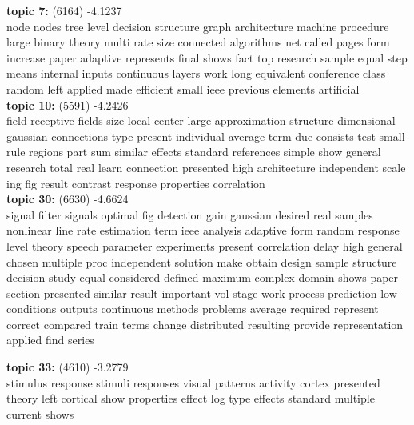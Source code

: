 \documentclass{article}
\begin{document}
\begin{spacing}{1.1}
\begin{table}[ht]
\begin{minipage}[b]{0.5\linewidth}
\begin{center}
{\bf topic 7:} (6164) -4.1237\\
node nodes tree level decision structure graph architecture machine procedure large binary theory multi rate size connected algorithms net called pages form increase paper adaptive represents final shows fact top research sample equal step means internal inputs continuous layers work long equivalent conference class random left applied made efficient small ieee previous elements artificial \\
{\bf topic 10:} (5591) -4.2426\\
field receptive fields size local center large approximation structure dimensional gaussian connections type present individual average term due consists test small rule regions part sum similar effects standard references simple show general research total real learn connection presented high architecture independent scale ing fig result contrast response properties correlation \\
{\bf topic 30:} (6630) -4.6624\\
signal filter signals optimal fig detection gain gaussian desired real samples nonlinear line rate estimation term ieee analysis adaptive form random response level theory speech parameter experiments present correlation delay high general chosen multiple proc independent solution make obtain design sample structure decision study equal considered defined maximum complex domain shows paper section presented similar result important vol stage work process prediction low conditions outputs continuous methods problems average required represent correct compared train terms change distributed resulting provide representation applied find series \\
\end{center}
\end{minipage}
\end{table}
\begin{table}[ht]
\begin{minipage}[b]{0.5\linewidth}
{\bf topic 33:} (4610)  -3.2779\\
stimulus response stimuli responses visual patterns activity cortex presented theory left cortical show properties effect log type effects standard multiple current shows \\\\\\\\\\\\\\

\end{minipage}
\end{table}
\end{spacing}
\end{document}
